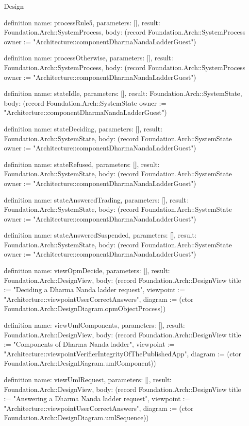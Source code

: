 \begin{lexlean}{Design}
\begin{semanticmodule}
definition{
  name: processRule5,
  parameters: [],
  result: Foundation.Arch::SystemProcess,
  body: (record Foundation.Arch::SystemProcess {owner := "Architecture::componentDharmaNandaLadderGuest"})
}

definition{
  name: processOtherwise,
  parameters: [],
  result: Foundation.Arch::SystemProcess,
  body: (record Foundation.Arch::SystemProcess {owner := "Architecture::componentDharmaNandaLadderGuest"})
}

definition{
  name: stateIdle,
  parameters: [],
  result: Foundation.Arch::SystemState,
  body: (record Foundation.Arch::SystemState {owner := "Architecture::componentDharmaNandaLadderGuest"})
}

definition{
  name: stateDeciding,
  parameters: [],
  result: Foundation.Arch::SystemState,
  body: (record Foundation.Arch::SystemState {owner := "Architecture::componentDharmaNandaLadderGuest"})
}

definition{
  name: stateRefused,
  parameters: [],
  result: Foundation.Arch::SystemState,
  body: (record Foundation.Arch::SystemState {owner := "Architecture::componentDharmaNandaLadderGuest"})
}

definition{
  name: stateAnsweredTrading,
  parameters: [],
  result: Foundation.Arch::SystemState,
  body: (record Foundation.Arch::SystemState {owner := "Architecture::componentDharmaNandaLadderGuest"})
}

definition{
  name: stateAnsweredSuspended,
  parameters: [],
  result: Foundation.Arch::SystemState,
  body: (record Foundation.Arch::SystemState {owner := "Architecture::componentDharmaNandaLadderGuest"})
}

definition{
  name: viewOpmDecide,
  parameters: [],
  result: Foundation.Arch::DesignView,
  body: (record Foundation.Arch::DesignView {title := "Deciding a Dharma Nanda ladder request", viewpoint := "Architecture::viewpointUserCorrectAnswers", diagram := (ctor Foundation.Arch::DesignDiagram.opmObjectProcess)})
}

definition{
  name: viewUmlComponents,
  parameters: [],
  result: Foundation.Arch::DesignView,
  body: (record Foundation.Arch::DesignView {title := "Components of Dharma Nanda ladder", viewpoint := "Architecture::viewpointVerifierIntegrityOfThePublishedApp", diagram := (ctor Foundation.Arch::DesignDiagram.umlComponent)})
}

definition{
  name: viewUmlRequest,
  parameters: [],
  result: Foundation.Arch::DesignView,
  body: (record Foundation.Arch::DesignView {title := "Answering a Dharma Nanda ladder request", viewpoint := "Architecture::viewpointUserCorrectAnswers", diagram := (ctor Foundation.Arch::DesignDiagram.umlSequence)})
}


\end{semanticmodule}
\end{lexlean}
